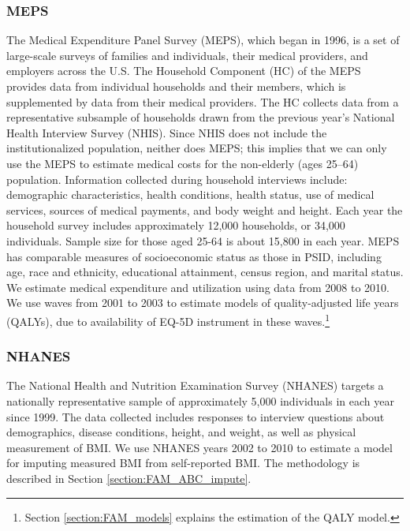\subsubsection{MEPS}
\noindent The Medical Expenditure Panel Survey (MEPS), which began in 1996, is a set of large-scale surveys of families and individuals, their medical providers, and employers across the U.S. The Household Component (HC) of the MEPS provides data from 
individual households and their members, which is supplemented by data from their medical providers. 
The HC collects data from a representative subsample of households drawn from the 
previous year's National Health Interview Survey (NHIS). Since NHIS does not include the 
institutionalized population, neither does MEPS; this implies that we can only use the MEPS to 
estimate medical costs for the non-elderly (ages 25--64) population. Information collected during household 
interviews include: demographic characteristics, health conditions, health status, use of medical 
services, sources of medical payments, and body weight and height. Each year the household survey 
includes approximately 12,000 households, or 34,000 individuals. Sample size for those aged 25-64 is 
about 15,800 in each year. MEPS has comparable measures of socioeconomic status as those in PSID, 
including age, race and ethnicity, educational attainment, census region, and marital status. We estimate medical expenditure 
and utilization using data from 2008 to 2010. We use waves from 2001 to 2003 to estimate models of quality-adjusted life years (QALYs), due to availability of EQ-5D instrument in these waves.\footnote{Section \ref{section:FAM_models} explains the estimation of the QALY model.} \\


\subsubsection{NHANES}
\noindent 
The National Health and Nutrition Examination Survey (NHANES) targets a nationally representative sample of approximately 5,000 individuals in each year since 1999. The data collected includes responses to interview questions about demographics, disease conditions, height, and weight, as well as physical measurement of BMI. We use NHANES years 2002 to 2010 to estimate a model for imputing measured BMI from self-reported BMI. The methodology is described in Section \ref{section:FAM_ABC_impute}.

